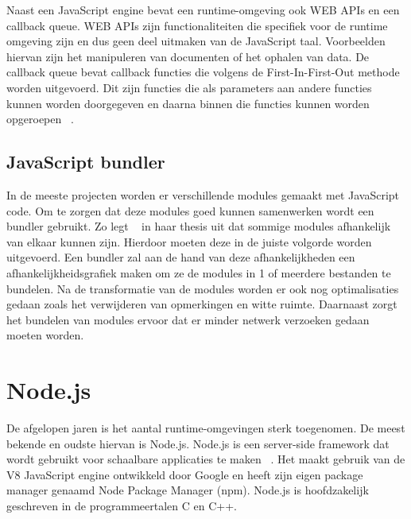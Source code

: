 Naast een JavaScript engine bevat een runtime-omgeving ook WEB APIs en een callback queue. 
WEB APIs zijn functionaliteiten die specifiek voor de runtime omgeving zijn en dus geen deel uitmaken van de JavaScript taal.
Voorbeelden hiervan zijn het manipuleren van documenten of het ophalen van data.
De callback queue bevat callback functies die volgens de First-In-First-Out methode worden uitgevoerd.
Dit zijn functies die als parameters aan andere functies kunnen worden doorgegeven en 
daarna binnen die functies kunnen worden opgeroepen ~\autocite{Eygi2020}.

\subsection{JavaScript bundler}
In de meeste projecten worden er verschillende modules gemaakt met JavaScript code. 
Om te zorgen dat deze modules goed kunnen samenwerken wordt een bundler gebruikt. 
Zo legt ~\textcite{Laurila2020} in haar thesis uit dat sommige modules afhankelijk van elkaar kunnen zijn. 
Hierdoor moeten deze in de juiste volgorde worden uitgevoerd. Een bundler zal aan de hand van deze afhankelijkheden 
een afhankelijkheidsgrafiek maken om ze de modules in 1 of meerdere bestanden te bundelen. 
Na de transformatie van de modules worden er ook nog optimalisaties gedaan zoals het verwijderen van opmerkingen en witte ruimte.
Daarnaast zorgt het bundelen van modules ervoor dat er minder netwerk verzoeken gedaan moeten worden.

\section{Node.js}
De afgelopen jaren is het aantal runtime-omgevingen sterk toegenomen. De meest bekende en oudste hiervan is Node.js.
Node.js is een server-side framework dat wordt gebruikt voor schaalbare applicaties te maken ~\autocite{Gackenheimer2013}.
Het maakt gebruik van de V8 JavaScript engine ontwikkeld door Google en heeft zijn eigen package manager genaamd Node Package Manager (npm).
Node.js is hoofdzakelijk geschreven in de programmeertalen C en C++.

